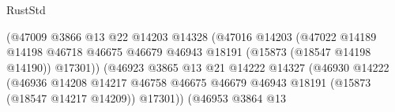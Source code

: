 \begin{lexlean}{RustStd}
\begin{coremodule}
                                                      (@47009
                                                        @3866
                                                        @13
                                                        @22
                                                        @14203
                                                        @14328
                                                        (@47016
                                                          @14203
                                                          (@47022
                                                            @14189
                                                            @14198
                                                            @46718
                                                            @46675
                                                            @46679
                                                            @46943
                                                            @18191
                                                            (@15873 (@18547 @14198 @14190))
                                                            @17301))
                                                        (@46923
                                                          @3865
                                                          @13
                                                          @21
                                                          @14222
                                                          @14327
                                                          (@46930
                                                            @14222
                                                            (@46936
                                                              @14208
                                                              @14217
                                                              @46758
                                                              @46675
                                                              @46679
                                                              @46943
                                                              @18191
                                                              (@15873 (@18547 @14217 @14209))
                                                              @17301))
                                                          (@46953
                                                            @3864
                                                            @13

\end{coremodule}
\end{lexlean}
